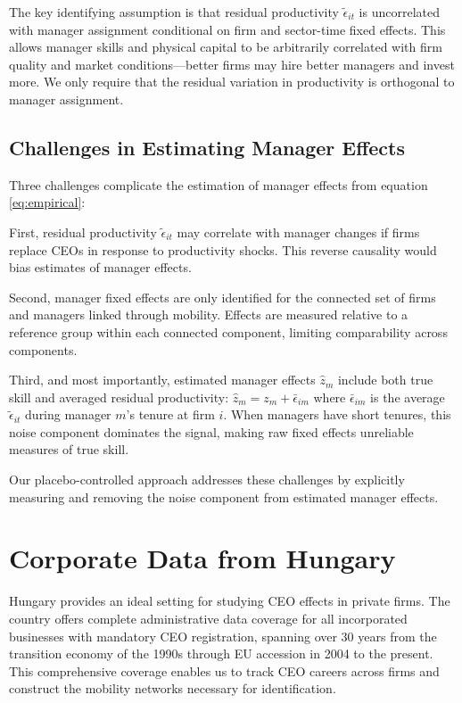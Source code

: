 \documentclass[11pt,a4paper]{article}
\begin{document}
The key identifying assumption is that residual productivity $\tilde{\epsilon}_{it}$ is uncorrelated with manager assignment conditional on firm and sector-time fixed effects. This allows manager skills and physical capital to be arbitrarily correlated with firm quality and market conditions—better firms may hire better managers and invest more. We only require that the residual variation in productivity is orthogonal to manager assignment.

\subsection{Challenges in Estimating Manager Effects}

Three challenges complicate the estimation of manager effects from equation \eqref{eq:empirical}:

First, residual productivity $\tilde{\epsilon}_{it}$ may correlate with manager changes if firms replace CEOs in response to productivity shocks. This reverse causality would bias estimates of manager effects.

Second, manager fixed effects are only identified for the connected set of firms and managers linked through mobility. Effects are measured relative to a reference group within each connected component, limiting comparability across components.

Third, and most importantly, estimated manager effects $\hat{z}_m$ include both true skill and averaged residual productivity: $\hat{z}_m = z_m + \bar{\epsilon}_{im}$ where $\bar{\epsilon}_{im}$ is the average $\tilde{\epsilon}_{it}$ during manager $m$'s tenure at firm $i$. When managers have short tenures, this noise component dominates the signal, making raw fixed effects unreliable measures of true skill.

Our placebo-controlled approach addresses these challenges by explicitly measuring and removing the noise component from estimated manager effects.

\section{Corporate Data from Hungary}

Hungary provides an ideal setting for studying CEO effects in private firms. The country offers complete administrative data coverage for all incorporated businesses with mandatory CEO registration, spanning over 30 years from the transition economy of the 1990s through EU accession in 2004 to the present. This comprehensive coverage enables us to track CEO careers across firms and construct the mobility networks necessary for identification.
\end{document}
